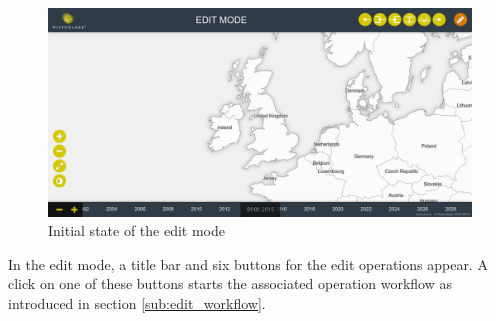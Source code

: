 \begin{minipage}[t]{0.47\textwidth}

  \begin{figure}[H]
    \centering
    \includegraphics[width=1.0\textwidth]{graphics/development/user_interface_design_process/2_edit_mode.png}
    \caption{Initial state of the edit mode}
    \label{fig:final_2_edit_mode}
  \end{figure}

  In the edit mode, a title bar and six buttons for the edit operations appear. A click on one of these buttons starts the associated operation workflow as introduced in section \ref{sub:edit_workflow}.

\end{minipage}

